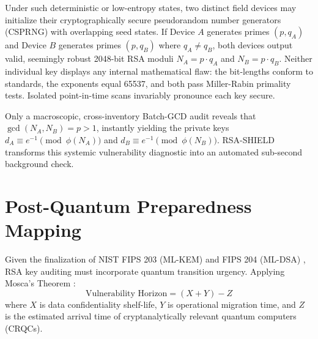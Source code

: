 \documentclass[sigconf,nonacm]{acmart}
\begin{document}
Under such deterministic or low-entropy states, two distinct field devices may initialize their cryptographically secure pseudorandom number generators (CSPRNG) with overlapping seed states. If Device $A$ generates primes $(p, q_A)$ and Device $B$ generates primes $(p, q_B)$ where $q_A \ne q_B$, both devices output valid, seemingly robust 2048-bit RSA moduli $N_A = p \cdot q_A$ and $N_B = p \cdot q_B$. Neither individual key displays any internal mathematical flaw: the bit-lengths conform to standards, the exponents equal 65537, and both pass Miller-Rabin primality tests. Isolated point-in-time scans invariably pronounce each key secure. 

Only a macroscopic, cross-inventory Batch-GCD audit reveals that $\gcd(N_A, N_B) = p > 1$, instantly yielding the private keys $d_A \equiv e^{-1} \pmod{\phi(N_A)}$ and $d_B \equiv e^{-1} \pmod{\phi(N_B)}$. RSA-SHIELD transforms this systemic vulnerability diagnostic into an automated sub-second background check.

\section{Post-Quantum Preparedness Mapping}
Given the finalization of NIST FIPS 203 (ML-KEM) and FIPS 204 (ML-DSA) \cite{nist2024fips203, nist2024fips204}, RSA key auditing must incorporate quantum transition urgency. Applying Mosca's Theorem \cite{mosca2018cybersecurity}:
\begin{equation}
\text{Vulnerability Horizon} = (X + Y) - Z
\end{equation}
where $X$ is data confidentiality shelf-life, $Y$ is operational migration time, and $Z$ is the estimated arrival time of cryptanalytically relevant quantum computers (CRQCs).

\begin{table}[htbp]
\caption{Cryptographic Overhead: RSA vs. NIST FIPS 203/204 PQC}
\label{tab:pqc_overhead}
\centering
{}
\end{table}
\end{document}
